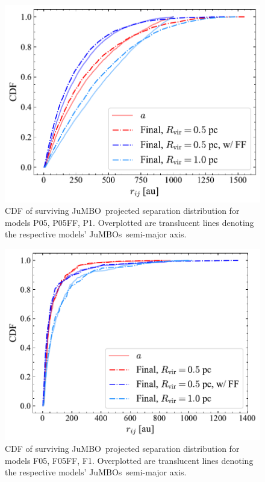 \documentclass[submission,phys]{lib/SciPost}
\newcommand{\jumbo}{\mbox{JuMBO}}
\newcommand{\jumbos}{\mbox{JuMBOs}}
\begin{document}
\begin{appendix}
    \begin{figure}
    \centering
        \includegraphics[width=\columnwidth]{figures/Plummer_General_proj_sep.pdf}
        \caption{CDF of surviving \jumbo\, projected separation distribution for models P05, P05FF, P1. Overplotted are translucent lines denoting the respective models' \jumbos\, semi-major axis.}
         \label{Fig:Plummer_rsep}
   \end{figure}
   \begin{figure}
    \centering
        \includegraphics[width=\columnwidth]{figures/Fractal_General_proj_sep.pdf}
        \caption{CDF of surviving \jumbo\, projected separation distribution for models F05, F05FF, F1. Overplotted are translucent lines denoting the respective models' \jumbos\, semi-major axis.}
         \label{Fig:Fractal_rsep}
   \end{figure}
\end{appendix}


    
\end{document}
